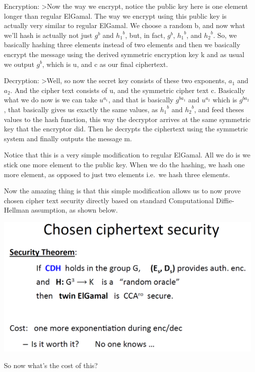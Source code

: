 \documentclass[11pt]{article}
\makeatletter
\def\maxwidth{\ifdim\Gin@nat@width>\linewidth\linewidth
    \else\Gin@nat@width\fi}
\let\Oldincludegraphics\includegraphics
\renewcommand{\includegraphics}[1]{\Oldincludegraphics[width=.8\maxwidth]{#1}}
\makeatother
\begin{document}
Encryption: \textgreater{}Now the way we encrypt, notice the public key
here is one element longer than regular ElGamal. The way we encrypt
using this public key is actually very similar to regular ElGamal. We
choose a random b, and now what we'll hash is actually not just \(g^b\)
and \({h_1}^b\), but, in fact, \(g^b\), \({h_1}^b\), and \({h_2}^b\).
So, we basically hashing three elements instead of two elements and then
we basically encrypt the message using the derived symmetric encryption
key k and as usual we output \(g^b\), which is u, and c as our final
ciphertext.

Decryption: \textgreater{}Well, so now the secret key consists of these
two exponents, \(a_1\) and \(a_2\). And the cipher text consists of u,
and the symmetric cipher text c. Basically what we do now is we can take
\(u^{a_1}\), and that is basically \(g^{b{a_1}}\) and \(u^{a_2}\) which
is \(g^{b{a_2}}\), that basically gives us exactly the same values, as
\({h_1}^b\) and \({h_2}^b\), and feed theses values to the hash
function, this way the decryptor arrives at the same symmetric key that
the encryptor did. Then he decrypts the ciphertext using the symmetric
system and finally outputs the message m.

Notice that this is a very simple modification to regular ElGamal. All
we do is we stick one more element to the public key. When we do the
hashing, we hash one more element, as opposed to just two elements
i.e.~we hash three elements.

Now the amazing thing is that this simple modification allows us to now
prove chosen cipher text security directly based on standard
Computational Diffie-Hellman assumption, as shown below.

\includegraphics{./Images/TwinElGamal-CCASecurity.png}

So now what's the cost of this?
\end{document}
